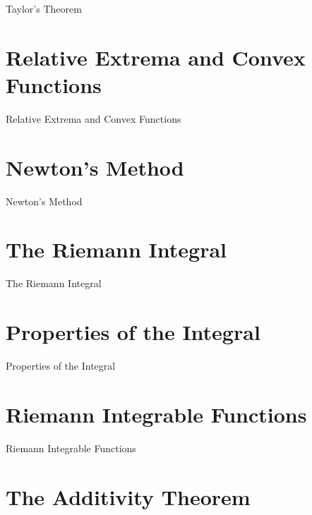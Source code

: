 Taylor's Theorem

\section{Relative Extrema and Convex Functions}
\label{sec:relative-extrema-and-convex-functions}

Relative Extrema and Convex Functions

\section{Newton's Method}
\label{sec:newton-s-method}

Newton's Method

\section{The Riemann Integral}
\label{sec:the-riemann-integral}

The Riemann Integral

\section{Properties of the Integral}
\label{sec:properties-of-the-integral}

Properties of the Integral

\section{Riemann Integrable Functions}
\label{sec:riemann-integrable-functions}

Riemann Integrable Functions

\section{The Additivity Theorem}
\label{sec:the-additivity-theorem}

